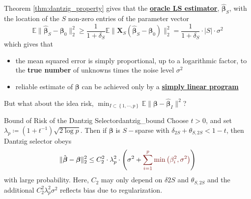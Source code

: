 \documentclass[twoside]{article}
\begin{document}
Theorem \ref{thm:dantzig_property} gives that the \textbf{\underline{oracle LS estimator}}, $ \hat{\boldsymbol{\beta}}_S $, with the location of the $S$ non-zero entries of the parameter vector
$$
\mathbb{E}\lVert \hat{\boldsymbol{\beta}}_S-\boldsymbol{\beta}_0 \rVert^2_2 \geq \frac{1}{1+\delta_S}\mathbb{E} \lVert \mathbf{X}_S \left(\hat{\boldsymbol{\beta}}_S-\boldsymbol{\beta}_0\right) \rVert^2_2 = \frac{1}{1+\delta_S}\cdot \lvert S \rvert \cdot \sigma^2
$$
which gives that 
\begin{itemize}
    \item the mean squared error is simply proportional, up to a logarithmic factor, to the \textbf{true number} of unknowns times the noise level $\sigma^2$
    \item reliable estimate of $\boldsymbol{\beta}$ can be achieved only by a \textbf{\underline{simply linear program}}
\end{itemize}

But what about the idea risk, $\min_{I\subset \left\{1,\cdots,p\right\}}\mathbb{E}\lVert \boldsymbol{\beta} -\hat{\boldsymbol{\beta}}_I \rVert^2$?
\begin{theorem}{Bound of Risk of the Dantzig Selector}{dantzig_bound}
Choose $t>0$, and set $\lambda_p \coloneq (1+t^{-1})\sqrt{2\log p}$. Then if $\boldsymbol{\beta}$ is $S-$sparse with $\delta_{2S}+\theta_{S,2S}<1-t$, then Dantzig selector obeys 
$$
\lVert \hat{\boldsymbol{\beta}} - \boldsymbol{\beta} \rVert^2_2 \leq C^2_2 \cdot \lambda_p^2 \cdot \left( \sigma^2 + \textcolor{myred}{\sum^p_{i=1}\min \left(\beta^2_i,\sigma^2\right)} \right)
$$
with large probability. Here, $C_2$ may only depend on $\delta{2S}$ and $\theta_{S,2S}$ and the additional $C_2^2\lambda_p^2\sigma^2$ reflects bias due to regularization.
\end{theorem}
\end{document}
